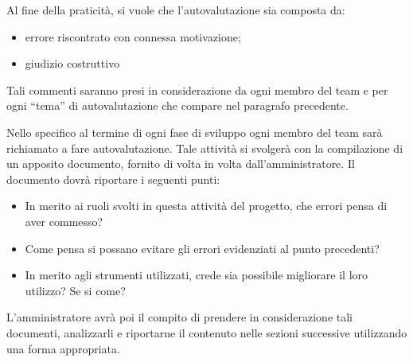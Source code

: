 Al fine della praticità, si vuole che l'autovalutazione sia composta da:

\begin{itemize}
	\item errore riscontrato con connessa motivazione;
	\item giudizio costruttivo
\end{itemize}

Tali commenti saranno presi in considerazione da ogni membro del team e per ogni ``tema'' di autovalutazione che compare nel paragrafo precedente.

Nello specifico al termine di ogni fase di sviluppo ogni membro del team sarà richiamato a fare autovalutazione. Tale attività si svolgerà con la compilazione di un apposito documento, fornito di volta in volta dall'amministratore. Il documento dovrà riportare i seguenti punti:

\begin{itemize}
	\item In merito ai ruoli svolti in questa attività del progetto, che errori pensa di aver commesso?
	\item Come pensa si possano evitare gli errori evidenziati al punto precedenti?
	\item In merito agli strumenti utilizzati, crede sia possibile migliorare il loro utilizzo? Se si come?
\end{itemize}

L'amministratore avrà poi il compito di prendere in considerazione tali documenti, analizzarli e riportarne il contenuto nelle sezioni successive utilizzando una forma appropriata.

